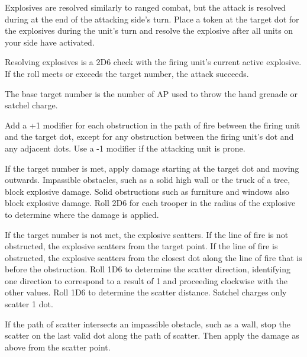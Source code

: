 Explosives are resolved similarly to ranged combat, but the attack is resolved during at the end of the attacking side's turn.
Place a token at the target dot for the explosives during the unit's turn and resolve the explosive after all units on your side have activated.

Resolving explosives is a 2D6 check with the firing unit's current active explosive.
If the roll meets or exceeds the target number, the attack succeeds.

The base target number is the number of AP used to throw the hand grenade or satchel charge.

Add a +1 modifier for each obstruction in the path of fire between the firing unit and the target dot, except for any obstruction between the firing unit's dot and any adjacent dots.
Use a -1 modifier if the attacking unit is prone.

If the target number is met, apply damage starting at the target dot and moving outwards.
Impassible obstacles, such as a solid high wall or the truck of a tree, block explosive damage.
Solid obstructions such as furniture and windows also block explosive damage.
Roll 2D6 for each trooper in the radius of the explosive to determine where the damage is applied.

If the target number is not met, the explosive scatters.
If the line of fire is not obstructed, the explosive scatters from the target point.
If the line of fire is obstructed, the explosive scatters from the closest dot along the line of fire that is before the obstruction.
Roll 1D6 to determine the scatter direction, identifying one direction to correspond to a result of 1 and proceeding clockwise with the other values.
Roll 1D6 to determine the scatter distance.
Satchel charges only scatter 1 dot.

If the path of scatter intersects an impassible obstacle, such as a wall, stop the scatter on the last valid dot along the path of scatter.
Then apply the damage as above from the scatter point.
